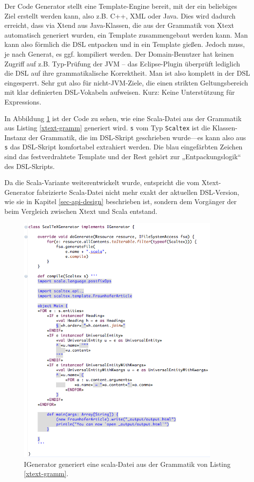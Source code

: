 Der Code Generator stellt eine Template-Engine bereit, mit der
ein beliebiges Ziel erstellt werden kann, also z.B. C++, XML oder Java.
Dies wird dadurch erreicht, dass via Xtend aus Java-Klassen, die aus der
Grammatik von Xtext automatisch generiert wurden, ein Template zusammengebaut
werden kann. Man kann also förmlich die DSL entpacken und in ein Template
gießen.
Jedoch muss, je nach Generat, es ggf. kompiliert werden. Der
Domain-Benutzer hat keinen Zugriff auf z.B. Typ-Prüfung der JVM --
das Eclipse-Plugin überprüft lediglich die DSL auf ihre
grammatikalische Korrektheit. Man ist also komplett in der DSL eingesperrt.
Sehr gut also für nicht-JVM-Ziele, die einen strikten Geltungsbereich mit
klar definierten DSL-Vokabeln aufweisen. Kurz: Keine Unterstützung für
Expressions.\cite{xtext}

In Abbildung \ref{fig-igenerator} ist der Code zu sehen, wie eine
Scala-Datei aus der Grammatik aus Listing \ref{xtext-gramm} generiert wird.
\verb+s+ vom Typ \verb+Scaltex+ ist die Klassen-Instanz der Grammatik,
die im DSL-Skript geschrieben wurde---es kann also aus \verb+s+ das DSL-Skript
komfortabel extrahiert werden. Die blau eingefärbten Zeichen sind
das festverdrahtete Template und der Rest gehört zur
„Entpackungslogik“ des DSL-Skripts.

Da die Scala-Variante weiterentwickelt wurde, entspricht
die vom Xtext-Generator fabrizierte Scala-Datei nicht mehr exakt der
aktuellen DSL-Version, wie sie in Kapitel \ref{sec-api-design} beschrieben ist,
sondern dem Vorgänger der beim Vergleich zwischen Xtext und Scala
entstand.

\begin{figure}[h!]
  \centering
    \includegraphics[width=0.9\textwidth]{figures/igenerator.png}
  \caption{IGenerator generiert eine scala-Datei aus der Grammatik von Listing \ref{xtext-gramm}.}\label{fig-igenerator}
\end{figure}

